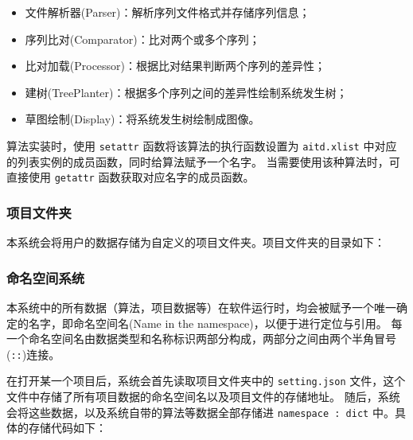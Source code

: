 \documentclass{article}
\begin{document}
\begin{multicols}{2}
\begin{itemize}
\item[1)] 文件解析器(Parser)：解析序列文件格式并存储序列信息；
\item[2)] 序列比对(Comparator)：比对两个或多个序列；
\item[3)] 比对加载(Processor)：根据比对结果判断两个序列的差异性；
\item[4)] 建树(TreePlanter)：根据多个序列之间的差异性绘制系统发生树；
\item[5)] 草图绘制(Display)：将系统发生树绘制成图像。
\end{itemize}

\par
算法实装时，使用 \verb|setattr| 函数将该算法的执行函数设置为 \verb|aitd.xlist| 中对应的列表实例的成员函数，同时给算法赋予一个名字。
当需要使用该种算法时，可直接使用 \verb|getattr| 函数获取对应名字的成员函数。

\subsubsection{项目文件夹}
\par
本系统会将用户的数据存储为自定义的项目文件夹。项目文件夹的目录如下：
\par
{}


\subsubsection{命名空间系统}
\par
本系统中的所有数据（算法，项目数据等）在软件运行时，均会被赋予一个唯一确定的名字，即命名空间名(Name in the namespace)，以便于进行定位与引用。
每一个命名空间名由数据类型和名称标识两部分构成，两部分之间由两个半角冒号(\verb|::|)连接。
\par
在打开某一个项目后，系统会首先读取项目文件夹中的 \verb|setting.json| 文件，这个文件中存储了所有项目数据的命名空间名以及项目文件的存储地址。
随后，系统会将这些数据，以及系统自带的算法等数据全部存储进 \verb|namespace : dict| 中。具体的存储代码如下：
\par



\end{multicols}
\end{document}
